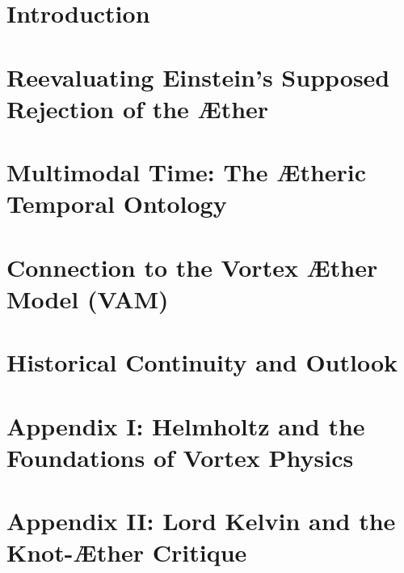 \documentclass[preprint,titlepage]{revtex4-2}
\begin{document}
   \maketitle
    \section{Introduction}\label{sec:introduction}
    

    \section{Reevaluating Einstein’s Supposed Rejection of the Æther}\label{sec:reevaluating-einsteins-supposed-rejection-of-the-ther}
    

    \section{Multimodal Time: The Ætheric Temporal Ontology}\label{sec:multimodal-time:-the-theric-temporal-ontology}
    

    \section{Connection to the Vortex Æther Model (VAM)}\label{sec:connection_to_VAM}
    

    \section{Historical Continuity and Outlook}\label{sec:historical-continuity-and-outlook}
    

    \appendix

        \section*{Appendix I: Helmholtz and the Foundations of Vortex Physics}
            \label{appendix:helmholtz}
            


        \section*{Appendix II: Lord Kelvin and the Knot-Æther Critique}
            \label{appendix:kelvin}
            
\end{document}
